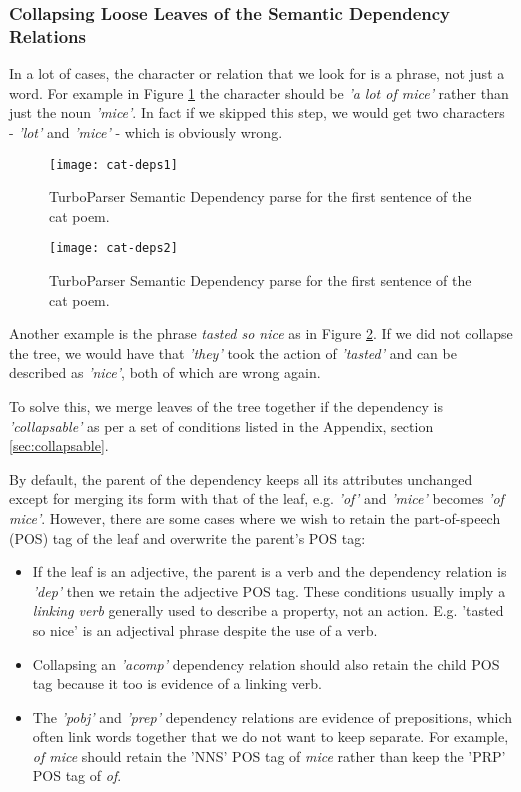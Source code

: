 \subsubsection{Collapsing Loose Leaves of the Semantic Dependency Relations}
\label{sec:collapse}

In a lot of cases, the character or relation that we look for is a phrase, not just a word. For example in Figure \ref{fig:cat-deps1} the character should be \textit{'a lot of mice'} rather than just the noun \textit{'mice'}. In fact if we skipped this step, we would get two characters - \textit{'lot'} and \textit{'mice'} - which is obviously wrong.

\begin{figure}[h!]
\centering
\texttt{[image: cat-deps1]}
\caption{TurboParser Semantic Dependency parse for the first sentence of the cat poem.}
\label{fig:cat-deps1}
\end{figure}

\begin{figure}[h!]
\centering
\texttt{[image: cat-deps2]}
\caption{TurboParser Semantic Dependency parse for the first sentence of the cat poem.}
\label{fig:cat-deps2}
\end{figure}

Another example is the phrase \textit{tasted so nice} as in Figure \ref{fig:cat-deps2}. If we did not collapse the tree, we would have that \textit{'they'} took the action of \textit{'tasted'} and can be described as \textit{'nice'}, both of which are wrong again.

To solve this, we merge leaves of the tree together if the dependency is \textit{'collapsable'} as per a set of conditions listed in the Appendix, section \ref{sec:collapsable}.

By default, the parent of the dependency keeps all its attributes unchanged except for merging its form with that of the leaf, e.g. \textit{'of'} and \textit{'mice'} becomes \textit{'of mice'}. However, there are some cases where we wish to retain the part-of-speech (POS) tag of the leaf and overwrite the parent's POS tag:

\begin{itemize}
\item{If the leaf is an adjective, the parent is a verb and the dependency relation is \textit{'dep'} then we retain the adjective POS tag. These conditions usually imply a \textit{linking verb} generally used to describe a property, not an action. E.g. 'tasted so nice' is an adjectival phrase despite the use of a verb.}
\item{Collapsing an \textit{'acomp'} dependency relation should also retain the child POS tag because it too is evidence of a linking verb.}
\item{The \textit{'pobj'} and \textit{'prep'} dependency relations are evidence of prepositions, which often link words together that we do not want to keep separate. For example, \textit{of mice} should retain the 'NNS' POS tag of \textit{mice} rather than keep the 'PRP' POS tag of \textit{of}. }
\end{itemize}

